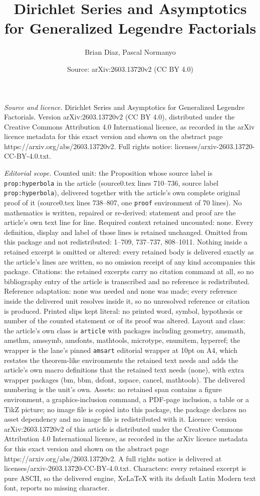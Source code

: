 \documentclass[10pt,a4paper]{amsart}
\title[Dirichlet Series and Asymptotics for Generalized Legendre Fa]{Dirichlet Series and Asymptotics for Generalized Legendre Factorials}
\author{Brian Diaz, Pascal Normanyo}
\date{Source: arXiv:2603.13720v2 (CC BY 4.0)}
\begin{document}
\maketitle

\noindent\emph{Source and licence.} Dirichlet Series and Asymptotics for Generalized Legendre Factorials. Version arXiv:2603.13720v2 (CC BY 4.0), distributed under the Creative Commons Attribution 4.0 International licence, as recorded in the arXiv licence metadata for this exact version and shown on the abstract page https://arxiv.org/abs/2603.13720v2. Full rights notice: licenses/arxiv-2603.13720-CC-BY-4.0.txt.\par\smallskip

\noindent\textit{Editorial scope.} Counted unit: the Proposition whose source label is \texttt{prop:hyperbola} in the article (source0.tex lines 710--736, source label \texttt{prop:hyperbola}), delivered together with the article's own complete original proof of it (source0.tex lines 738--807, one \texttt{proof} environment of 70 lines). No mathematics is written, repaired or re-derived: statement and proof are the article's own text line for line. Required context retained uncounted: none. Every definition, display and label of those lines is retained unchanged. Omitted from this package and not redistributed: 1--709, 737--737, 808--1011. Nothing inside a retained excerpt is omitted or altered: every retained body is delivered exactly as the article's lines are written, so no omission receipt of any kind accompanies this package. Citations: the retained excerpts carry no citation command at all, so no bibliography entry of the article is transcribed and no reference is redistributed. Reference adaptation: none was needed and none was made; every reference inside the delivered unit resolves inside it, so no unresolved reference or citation is produced. Printed slips kept literal: no printed word, symbol, hypothesis or number of the counted statement or of its proof was altered. Layout and class: the article's own class is \texttt{article} with packages including geometry, amsmath, amsthm, amssymb, amsfonts, mathtools, microtype, enumitem, hyperref; the wrapper is the lane's pinned \texttt{amsart} editorial wrapper at 10pt on A4, which restates the theorem-like environments the retained text needs and adds the article's own macro definitions that the retained text needs (none), with extra wrapper packages (bm, bbm, dsfont, xspace, cancel, mathtools). The delivered numbering is the unit's own. Assets: no retained span contains a figure environment, a graphics-inclusion command, a PDF-page inclusion, a table or a TikZ picture; no image file is copied into this package, the package declares no asset dependency and no image file is redistributed with it. Licence: version arXiv:2603.13720v2 of this article is distributed under the Creative Commons Attribution 4.0 International licence, as recorded in the arXiv licence metadata for this exact version and shown on the abstract page https://arxiv.org/abs/2603.13720v2. A full rights notice is delivered at licenses/arxiv-2603.13720-CC-BY-4.0.txt. Characters: every retained excerpt is pure ASCII, so the delivered engine, XeLaTeX with its default Latin Modern text font, reports no missing character.
\end{document}

